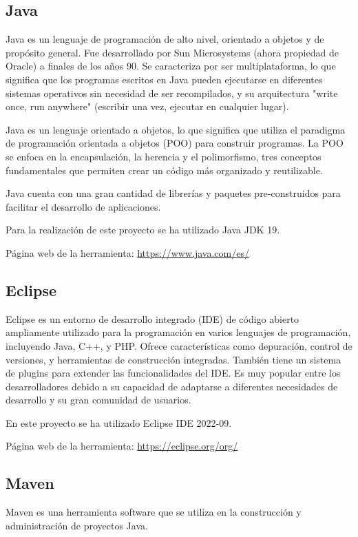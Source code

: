 \subsection{Java}
Java es un lenguaje de programación de alto nivel, orientado a objetos y de propósito general. Fue desarrollado por Sun Microsystems (ahora propiedad de Oracle) a finales de los años 90. Se caracteriza por ser multiplataforma, lo que significa que los programas escritos en Java pueden ejecutarse en diferentes sistemas operativos sin necesidad de ser recompilados, y su arquitectura "write once, run anywhere" (escribir una vez, ejecutar en cualquier lugar).

Java es un lenguaje orientado a objetos, lo que significa que utiliza el paradigma de programación orientada a objetos (POO) para construir programas. La POO se enfoca en la encapsulación, la herencia y el polimorfismo, tres conceptos fundamentales que permiten crear un código más organizado y reutilizable. \cite{wiki:java}

Java cuenta con una gran cantidad de librerías y paquetes pre-construidos para facilitar el desarrollo de aplicaciones.

Para la realización de este proyecto se ha utilizado Java JDK 19.

Página web de la herramienta: \url{https://www.java.com/es/}

\subsection{Eclipse}
Eclipse es un entorno de desarrollo integrado (IDE) de código abierto ampliamente utilizado para la programación en varios lenguajes de programación, incluyendo Java, C++, y PHP. Ofrece características como depuración, control de versiones, y herramientas de construcción integradas. También tiene un sistema de plugins para extender las funcionalidades del IDE. Es muy popular entre los desarrolladores debido a su capacidad de adaptarse a diferentes necesidades de desarrollo y su gran comunidad de usuarios. \cite{wiki:eclipse}

En este proyecto se ha utilizado Eclipse IDE 2022‑09.

Página web de la herramienta: \url{https://eclipse.org/org/}

\subsection{Maven}
Maven es una herramienta software que se utiliza en la construcción y administración de proyectos Java.

